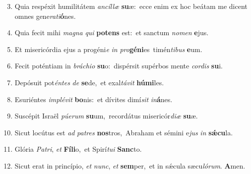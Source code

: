 \begin{enumerate}
    \setcounter{enumi}{2}

    \item Quia respéxit humilitátem \textit{an}\textit{cíl}\textit{læ} \textbf{su}æ:~\redgreheightstar ecce enim ex hoc beátam me dicent omnes gene\textit{ra}\textit{ti}\textbf{ó}nes.

    \item Quia fecit mihi \textit{ma}\textit{gna} \textit{qui} \textbf{pot}\textbf{ens} est:~\redgreheightstar et sanctum \textit{no}\textit{men} \textbf{e}jus.

    \item Et misericórdia ejus a progéni\textit{e} \textit{in} \textit{pro}\textbf{gé}\textbf{ni}es~\redgreheightstar timén\textit{ti}\textit{bus} \textbf{e}um.

    \item Fecit poténtiam in \textit{brá}\textit{chi}\textit{o} \textbf{su}o:~\redgreheightstar dispérsit supérbos mente \textit{cor}\textit{dis} \textbf{su}i.

    \item Depósuit pot\textit{én}\textit{tes} \textit{de} \textbf{se}de,~\redgreheightstar et exal\textit{tá}\textit{vit} \textbf{hú}\textbf{mi}les.

    \item Esuriéntes \textit{im}\textit{plé}\textit{vit} \textbf{bo}nis:~\redgreheightstar et dívites dimí\textit{sit} \textit{in}\textbf{á}nes.

    \item Suscépit Israël \textit{pú}\textit{e}\textit{rum} \textbf{su}um,~\redgreheightstar recordátus misericór\textit{di}\textit{æ} \textbf{su}æ.

    \item Sicut locútus est \textit{ad} \textit{pa}\textit{tres} \textbf{nos}tros,~\redgreheightstar Abraham et sémini e\textit{jus} \textit{in} \textbf{sǽ}\textbf{cu}la.

    \item Glória \textit{Pa}\textit{tri}, \textit{et} \textbf{Fí}\textbf{li}o,~\redgreheightstar et Spirí\textit{tu}\textit{i} \textbf{Sanc}to.

    \item Sicut erat in princípio, \textit{et} \textit{nunc}, \textit{et} \textbf{sem}per,~\redgreheightstar et in sǽcula sæcu\textit{ló}\textit{rum}. \textbf{A}men.

\end{enumerate}
